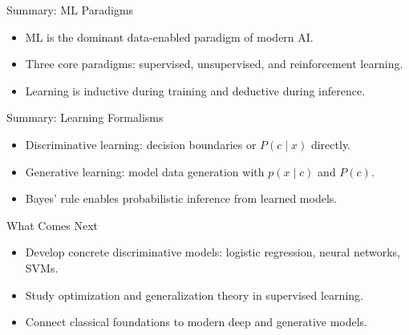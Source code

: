 \documentclass[10pt]{beamer}
\begin{document}
\begin{frame}{Summary: ML Paradigms}
    \justifying
    \begin{itemize}
        \item ML is the dominant data-enabled paradigm of modern AI.
        \item Three core paradigms: supervised, unsupervised, and reinforcement learning.
        \item Learning is inductive during training and deductive during inference.
    \end{itemize}
\end{frame}

\begin{frame}{Summary: Learning Formalisms}
    \justifying
    \begin{itemize}
        \item Discriminative learning: decision boundaries or $P(c \mid x)$ directly.
        \item Generative learning: model data generation with $p(x \mid c)$ and $P(c)$.
        \item Bayes' rule enables probabilistic inference from learned models.
    \end{itemize}
\end{frame}

\begin{frame}{What Comes Next}
    \justifying
    \begin{itemize}
        \item Develop concrete discriminative models: logistic regression, neural networks, SVMs.
        \item Study optimization and generalization theory in supervised learning.
        \item Connect classical foundations to modern deep and generative models.
    \end{itemize}
\end{frame}
\end{document}
